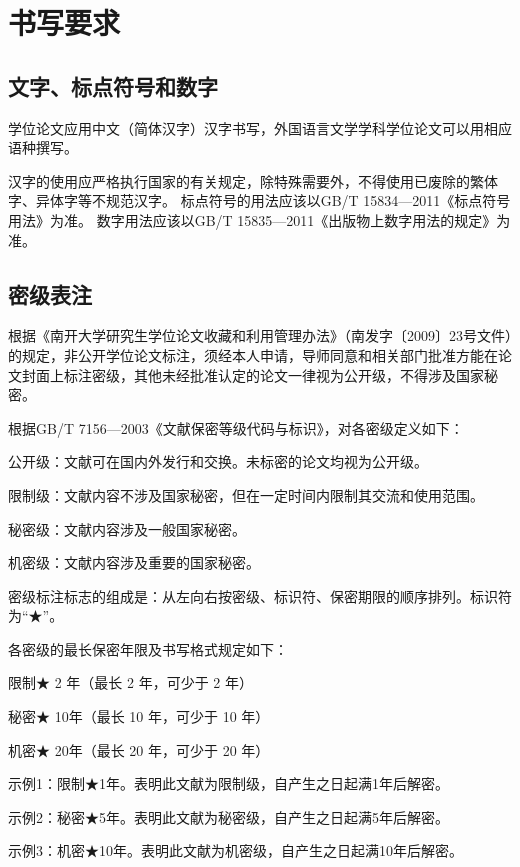 \chapter{书写要求}
\label{chap:writing-requirements}

\section{文字、标点符号和数字}

学位论文应用中文（简体汉字）汉字书写，外国语言文学学科学位论文可以用相应语种撰写。

汉字的使用应严格执行国家的有关规定，除特殊需要外，不得使用已废除的繁体字、异体字等不规范汉字。
标点符号的用法应该以GB/T 15834—2011《标点符号用法》为准。
数字用法应该以GB/T 15835—2011《出版物上数字用法的规定》为准。

\section{密级表注}
\label{sec:writing-classification}

根据《南开大学研究生学位论文收藏和利用管理办法》（南发字〔2009〕23号文件）的规定，非公开学位论文标注，须经本人申请，导师同意和相关部门批准方能在论文封面上标注密级，其他未经批准认定的论文一律视为公开级，不得涉及国家秘密。

根据GB/T 7156—2003《文献保密等级代码与标识》，对各密级定义如下：

公开级：文献可在国内外发行和交换。未标密的论文均视为公开级。

限制级：文献内容不涉及国家秘密，但在一定时间内限制其交流和使用范围。

秘密级：文献内容涉及一般国家秘密。

机密级：文献内容涉及重要的国家秘密。

密级标注标志的组成是：从左向右按密级、标识符、保密期限的顺序排列。标识符为“{\segoeui{}★}”。

各密级的最长保密年限及书写格式规定如下：

限制{\segoeui{}★} 2 年（最长 2 年，可少于 2 年）

秘密{\segoeui{}★} 10年（最长 10 年，可少于 10 年）

机密{\segoeui{}★} 20年（最长 20 年，可少于 20 年）

示例1：限制{\segoeui{}★}1年。表明此文献为限制级，自产生之日起满1年后解密。

示例2：秘密{\segoeui{}★}5年。表明此文献为秘密级，自产生之日起满5年后解密。

示例3：机密{\segoeui{}★}10年。表明此文献为机密级，自产生之日起满10年后解密。

